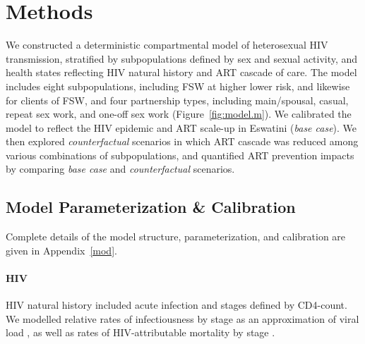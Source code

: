 \section{Methods}\label{art.meth}
We constructed a deterministic compartmental model of heterosexual HIV transmission, stratified by
subpopulations defined by sex and sexual activity, and
health states reflecting HIV natural history and ART cascade of care.
The model includes eight subpopulations,
including FSW at higher \vs lower risk, and likewise for clients of FSW,
and four partnership types, including
main/spousal, casual, repeat sex work, and one-off sex work (Figure~\ref{fig:model.m}).
We calibrated the model to reflect the HIV epidemic and ART scale-up in Eswatini (\emph{base case}).
We then explored \emph{counterfactual} scenarios in which
ART cascade was reduced among various combinations of subpopulations,
and quantified ART prevention impacts by comparing \emph{base case} and \emph{counterfactual} scenarios.
\subsection{Model Parameterization \& Calibration}\label{art.meth.par}
Complete details of the model structure, parameterization, and calibration are given in Appendix~\ref{mod}.
\mf{}
\paragraph{HIV}
HIV natural history included acute infection and stages defined by CD4-count.
We modelled relative rates of infectiousness by stage
as an approximation of viral load \cite{Boily2009,Donnell2010,Bellan2015},
as well as rates of HIV-attributable mortality by stage \cite{Mangal2017}.

